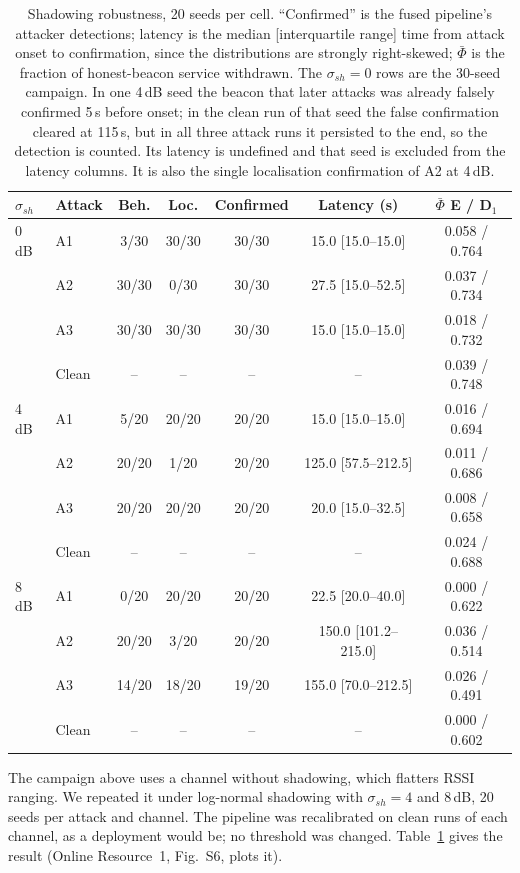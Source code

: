 \documentclass[pdflatex,sn-mathphys-num]{sn-jnl}%
\theoremstyle{thmstyleone}%
\theoremstyle{thmstyletwo}%
\theoremstyle{thmstylethree}%
\begin{document}
\begin{table}[!t]
\caption{Shadowing robustness, 20 seeds per cell. ``Confirmed'' is the fused
pipeline's attacker detections; latency is the median [interquartile range]
time from attack onset to confirmation, since the distributions are strongly
right-skewed; $\bar\Phi$ is the fraction of honest-beacon service withdrawn.
The $\sigma_{sh} = 0$ rows are the 30-seed campaign. In one 4\,dB seed the
beacon that later attacks was already falsely confirmed 5\,s before onset; in
the clean run of that seed the false confirmation cleared at 115\,s, but in
all three attack runs it persisted to the end, so the detection is counted.
Its latency is undefined and that seed is excluded from the latency columns.
It is also the single localisation confirmation of A2 at 4\,dB.}
\label{tab:shadow}
\centering
\footnotesize
\setlength{\tabcolsep}{4pt}
\begin{tabular}{@{}llccccc@{}}
\toprule
$\sigma_{sh}$ & Attack & Beh. & Loc. & Confirmed & Latency (s) & $\bar\Phi$ E / D$_1$ \\
\midrule
0\,dB & A1 & 3/30 & 30/30 & 30/30 & 15.0 [15.0--15.0] & 0.058 / 0.764 \\
      & A2 & 30/30 & 0/30 & 30/30 & 27.5 [15.0--52.5] & 0.037 / 0.734 \\
      & A3 & 30/30 & 30/30 & 30/30 & 15.0 [15.0--15.0] & 0.018 / 0.732 \\
      & Clean & -- & -- & -- & -- & 0.039 / 0.748 \\
4\,dB & A1 & 5/20 & 20/20 & 20/20 & 15.0 [15.0--15.0] & 0.016 / 0.694 \\
      & A2 & 20/20 & 1/20 & 20/20 & 125.0 [57.5--212.5] & 0.011 / 0.686 \\
      & A3 & 20/20 & 20/20 & 20/20 & 20.0 [15.0--32.5] & 0.008 / 0.658 \\
      & Clean & -- & -- & -- & -- & 0.024 / 0.688 \\
8\,dB & A1 & 0/20 & 20/20 & 20/20 & 22.5 [20.0--40.0] & 0.000 / 0.622 \\
      & A2 & 20/20 & 3/20 & 20/20 & 150.0 [101.2--215.0] & 0.036 / 0.514 \\
      & A3 & 14/20 & 18/20 & 19/20 & 155.0 [70.0--212.5] & 0.026 / 0.491 \\
      & Clean & -- & -- & -- & -- & 0.000 / 0.602 \\
\bottomrule
\end{tabular}
\end{table}

The campaign above uses a channel without shadowing, which flatters RSSI
ranging. We repeated it under log-normal shadowing with $\sigma_{sh} = 4$ and
8\,dB, 20 seeds per attack and channel. The pipeline was recalibrated on clean
runs of each channel, as a deployment would be; no threshold was changed.
Table~\ref{tab:shadow} gives the result (Online Resource~1, Fig.~S6, plots it).
\end{document}
